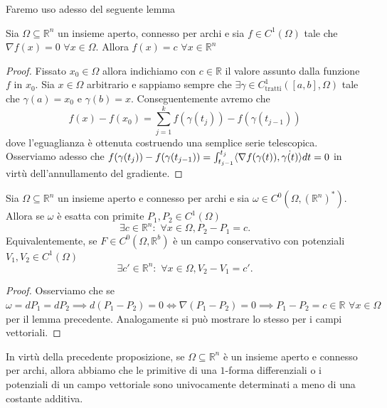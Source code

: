 Faremo uso adesso del seguente lemma
\begin{lemma}[CF2]
	Sia $\Omega \subseteq \mathbb{R}^n$ un insieme aperto, connesso per archi e sia $f \in C^1(\Omega)$ tale che $\nabla f(x) = 0 \, \, \forall x \in \Omega$. Allora
	$f(x)=c \, \, \forall x \in \mathbb{R}^n$
\end{lemma}
\begin{proof}
	Fissato $x_0 \in \Omega$ allora indichiamo con $c \in \mathbb{R}$ il valore assunto dalla funzione $f$ in $x_0$. Sia $x \in \Omega$ arbitrario e sappiamo sempre che $\exists \gamma \in C^1_\text{tratti}([a, b], \Omega)$ tale che $\gamma(a) = x_0$ e $\gamma(b)=x$.
	Conseguentemente avremo che 
	$$
	f(x)-f(x_0) = \sum_{j=1}^k f(\gamma(t_j)) - f(\gamma(t_{j-1}))
	$$
	dove l'eguaglianza è ottenuta costruendo una semplice serie telescopica. Osserviamo adesso che $f(\gamma(t_j)) - f(\gamma(t_{j-1})) = \int_{t_{j-1}}^{t_j} \langle \nabla f(\gamma(t)), \dot{\gamma(t)} \rangle dt = 0$ in virtù dell'annullamento del gradiente.
\end{proof}
\begin{prop}
	Sia $\Omega \subseteq \mathbb{R}^n$ un insieme aperto e connesso per archi e sia $\omega \in C^0(\Omega, (\mathbb{R}^n)^*)$. Allora se $\omega$ è esatta con primite $P_1, P_2 \in C^1(\Omega)$
	$$
	\exists c \in \mathbb{R}^n : \, \, \forall x \in \Omega, P_2 - P_1 = c.
	$$
	Equivalentemente, se $F \in C^0(\Omega, \mathbb{R}^b)$ è un campo conservativo con potenziali $V_1, V_2 \in C^1(\Omega)$
	$$
	\exists c' \in \mathbb{R}^n : \, \, \forall x \in \Omega, V_2 - V_1 = c'.
	$$
\end{prop}
\begin{proof}
Osserviamo che se $\omega = dP_1 = dP_2 \implies d(P_1 - P_2) = 0 \iff \nabla (P_1 - P_2) = 0 \implies P_1 - P_2 = c \in \mathbb{R} \, \, \forall x \in \Omega$ per il lemma precedente. Analogamente si può mostrare lo stesso per i campi vettoriali.
\end{proof}
\begin{remark}
In virtù della precedente proposizione, se $\Omega \subseteq \mathbb{R}^n$ è un insieme aperto e connesso per archi, allora abbiamo che le primitive di una $1$-forma differenziali o i potenziali di un campo vettoriale sono univocamente determinati
a meno di una costante additiva.
\end{remark}
